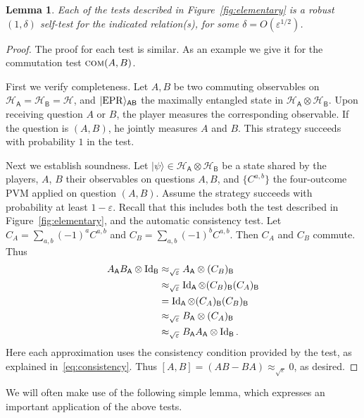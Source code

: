 \documentclass[11pt]{article}
\newtheorem{lemma}[theorem]{Lemma}
\theoremstyle{remark}
\theoremstyle{definition}
\newcommand{\ket}[1]{|#1\rangle}
\newcommand{\Id}{\ensuremath{\mathop{\rm Id}\nolimits}}
\newcommand{\reg}[1]{{\textsf{#1}}}
\newcommand{\mH}{\mathcal{H}}
\newcommand{\eps}{\varepsilon}
\newcommand{\EPR}{{\rm EPR}}
\newcommand{\comt}{\textsc{com}}
\begin{document}
\begin{lemma}\label{lem:elementary}
Each of the tests described in Figure~\ref{fig:elementary} is a robust $(1,\delta)$ self-test for the indicated relation(s), for some $\delta = O(\eps^{1/2})$. 
\end{lemma}

\begin{proof}
The proof for each test is similar. As an example we give it for the commutation test $\comt(A,B)$. 

First we verify completeness. Let $A,B$ be two commuting observables on $\mH_{\reg{A}} = \mH_{\reg{B}} = \mH$, and $\ket{\EPR}_{\reg{AB}}$ the maximally entangled state in $\mH_\reg{A}\otimes \mH_\reg{B}$. Upon receiving question $A$ or $B$, the player measures the corresponding observable. If the question is $(A,B)$, he jointly measures $A$ and $B$. This strategy succeeds with probability $1$ in the test. 

Next we establish soundness. Let $\ket{\psi} \in \mH_{\reg{A}}\otimes \mH_\reg{B}$ be a state shared by the players, $A$, $B$ their observables on questions $A,B$, and $\{C^{a,b}\}$ the four-outcome PVM applied on question $(A,B)$. Assume the strategy succeeds with probability at least $1-\eps$. Recall that this includes both the test described in Figure~\ref{fig:elementary}, and the automatic consistency test. Let $C_A = \sum_{a,b} (-1)^a C^{a,b}$ and $C_B = \sum_{a,b} (-1)^b C^{a,b}$. Then $C_A$ and $C_B$ commute. Thus
\begin{align*}
A_\reg{A} B_\reg{A} \otimes \Id_\reg{B}
&\approx_{\sqrt{\eps}} A_\reg{A} \otimes (C_B)_\reg{B}\\
&\approx_{\sqrt{\eps}} \Id_\reg{A} \otimes (C_B)_\reg{B}(C_A)_\reg{B}\\
&=  \Id_\reg{A} \otimes (C_A)_\reg{B}(C_B)_\reg{B}\\
&\approx_{\sqrt{\eps}} B_\reg{A} \otimes (C_A)_\reg{B}\\
&\approx_{\sqrt{\eps}} B_\reg{A} A_\reg{A} \otimes \Id_\reg{B}.
\end{align*}
Here each approximation uses the consistency condition provided by the test, as explained in~\eqref{eq:consistency}. Thus $[A,B] = (AB-BA) \approx_{\sqrt{\eps}} 0$, as desired. 
\end{proof}

We will often make use of the following simple lemma, which expresses an important application of the above tests. 
\end{document}
